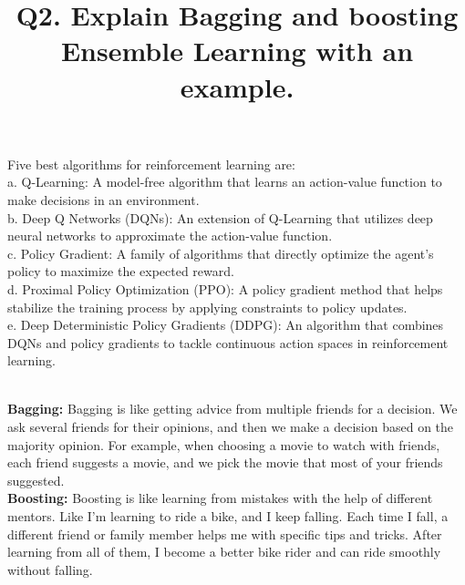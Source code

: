 \documentclass[a4paper,12pt]{article}
\begin{document}
Five best algorithms for reinforcement learning are:\\

a. Q-Learning: A model-free algorithm that learns an action-value function to make decisions in an environment.
\\

b. Deep Q Networks (DQNs): An extension of Q-Learning that utilizes deep neural networks to approximate the action-value function.
\\

c. Policy Gradient: A family of algorithms that directly optimize the agent's policy to maximize the expected reward.
\\

d. Proximal Policy Optimization (PPO): A policy gradient method that helps stabilize the training process by applying constraints to policy updates.
\\

e. Deep Deterministic Policy Gradients (DDPG): An algorithm that combines DQNs and policy gradients to tackle continuous action spaces in reinforcement learning.\\





\title{\textbf{Q2. Explain Bagging and boosting Ensemble Learning with an example.}}\\


\textbf{Bagging:}
Bagging is like getting advice from multiple friends for a decision. We ask several friends for their opinions, and then we make a decision based on the majority opinion. For example, when choosing a movie to watch with friends, each friend suggests a movie, and we pick the movie that most of your friends suggested.\\

\textbf{Boosting:}
Boosting is like learning from mistakes with the help of different mentors. Like I'm learning to ride a bike, and I keep falling. Each time I fall, a different friend or family member helps me with specific tips and tricks. After learning from all of them, I become a better bike rider and can ride smoothly without falling.
\end{document}
